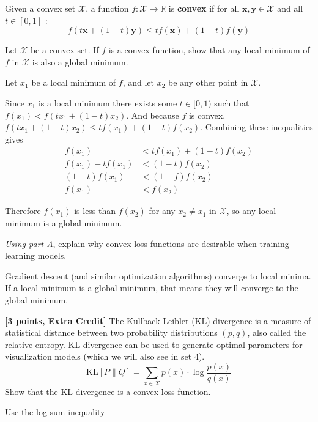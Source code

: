 Given a convex set $\mathcal{X}$, a function $f:\mathcal{X}\to\mathbb{R}$ is \textbf{convex} if for all $\textbf{x},\textbf{y}\in \mathcal{X}$ and all $t\in[0,1]$ :
\[f(t\textbf{x} + (1-t)\textbf{y}) \leq tf(\textbf{x}) + (1-t)f(\textbf{y})\]

\begin{problem}[3]
Let $\mathcal{X}$ be a convex set. If $f$ is a convex function, show that any local minimum of $f$ in $\mathcal{X}$ is also a global minimum.
\end{problem}

\begin{solution}
    Let $x_1$ be a local minimum of $f$, and let $x_2$ be any other point in $\mathcal{X}$.

    Since $x_1$ is a local minimum there exists some $t \in [0, 1)$ such that $f(x_1) < f(t x_1 + (1 - t) x_2)$.
    And because $f$ is convex, $f(t x_1 + (1 - t) x_2) \leq t f(x_1) + (1 - t) f(x_2)$.
    Combining these inequalities gives 
    \begin{align*}
        f(x_1) &< t f(x_1) + (1 - t) f(x_2) \\
        f(x_1) - t f(x_1) &< (1 - t) f(x_2) \\
        (1 - t) f(x_1) &< (1 - f) f(x_2) \\
        f(x_1) &< f(x_2)
    \end{align*}

    Therefore $f(x_1)$ is less than $f(x_2)$ for any $x_2 \neq x_1$ in $\mathcal{X}$, so any local minimum is a global minimum.
\end{solution}

\begin{problem}[4]
\emph{Using part A}, explain why convex loss functions are desirable when training learning models.
\end{problem}

\begin{solution}
    Gradient descent (and similar optimization algorithms) converge to local minima.
    If a local minimum is a global minimum, that means they will converge to the global minimum.
\end{solution}

\problem\textbf{[3 points, Extra Credit] }
The Kullback-Leibler (KL) divergence is a measure of statistical distance between two probability distributions $(p, q)$, also called the relative entropy. KL divergence can be used to generate optimal parameters for visualization models (which we will also see in set 4).
\[\mathrm{KL}[P\|Q] = \sum_{x\in\mathcal{X}} p(x) \cdot \log \frac{p(x)}{q(x)}\]
Show that the KL divergence is a convex loss function. \\

\begin{hint}
    Use the log sum inequality
\end{hint}

\begin{solution}
   
\end{solution}
